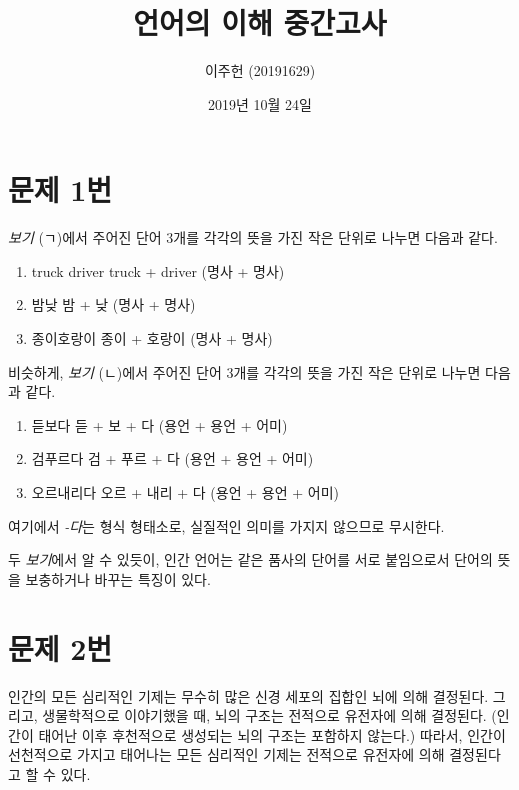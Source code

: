 \documentclass{article}
\title{언어의 이해 중간고사}
\author{이주헌 (20191629)}
\date{2019년 10월 24일}
\begin{document}
    
    \maketitle
    
    \section{문제 1번}
    
        \emph{보기} (ㄱ)에서 주어진 단어 3개를 각각의 뜻을 가진 작은 단위로 나누면 다음과 같다.
        \begin{enumerate}
            \item truck driver \textrightarrow{} truck + driver \textrightarrow{} (명사 + 명사)
            \item 밤낮 \textrightarrow{} 밤 + 낮 \textrightarrow{} (명사 + 명사)
            \item 종이호랑이 \textrightarrow{} 종이 + 호랑이 \textrightarrow{} (명사 + 명사)
        \end{enumerate}
        비슷하게, \emph{보기} (ㄴ)에서 주어진 단어 3개를 각각의 뜻을 가진 작은 단위로 나누면 다음과 같다.
        \begin{enumerate}
            \item 듣보다 \textrightarrow{} 듣 + 보 + 다 \textrightarrow{} (용언 + 용언 + 어미)
            \item 검푸르다 \textrightarrow{} 검 + 푸르 + 다 \textrightarrow{} (용언 + 용언 + 어미)
            \item 오르내리다 \textrightarrow{} 오르 + 내리 + 다 \textrightarrow{} (용언 + 용언 + 어미)
        \end{enumerate}
        여기에서 \emph{-다}는 형식 형태소로, 실질적인 의미를 가지지 않으므로 무시한다.
    
        두 \emph{보기}에서 알 수 있듯이, 인간 언어는 같은 품사의 단어를 서로 붙임으로서 단어의 뜻을 보충하거나 바꾸는 특징이 있다.
    
    \section{문제 2번}
        
        인간의 모든 심리적인 기제는 무수히 많은 신경 세포의 집합인 뇌에 의해 결정된다. 그리고, 생물학적으로 이야기했을 때, 뇌의 구조는 전적으로 유전자에 의해 결정된다. (인간이 태어난 이후 후천적으로 생성되는 뇌의 구조는 포함하지 않는다.) 따라서, 인간이 선천적으로 가지고 태어나는 모든 심리적인 기제는 전적으로 유전자에 의해 결정된다고 할 수 있다.
        
\end{document}
